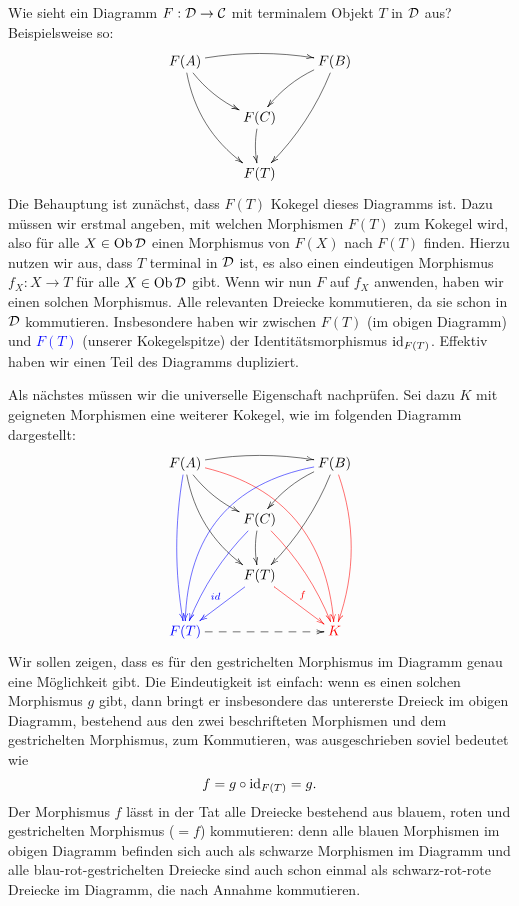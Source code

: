 \documentclass{pizzablatt}
\begin{document}

\begin{aufgabe}{}
Wie sieht ein Diagramm $F:\mathcal{D} \to \mathcal{C}$ mit terminalem Objekt $T$ in $\mathcal{D}$ aus? Beispielsweise so:
\[ \xymatrix{
  F(A) \ar@/^/[rr] \ar@/_/[dr] \ar@/_1pc/[ddr] && F(B) \ar@/_/[dl] \ar@/^/[ddl] \\
  & F(C) \ar@/_0.25pc/[d] \\
  & F(T)
} \]
Die Behauptung ist zunächst, dass $F(T)$ Kokegel dieses Diagramms ist. Dazu müssen wir erstmal angeben, mit welchen Morphismen $F(T)$ zum Kokegel wird, also für alle $X \in \operatorname{Ob} \mathcal{D}$ einen Morphismus von $F(X)$ nach $F(T)$ finden. Hierzu nutzen wir aus, dass $T$ terminal in $\mathcal{D}$ ist, es also einen eindeutigen Morphismus $f_X:X \to T$ für alle $X \in \operatorname{Ob} \mathcal{D}$ gibt. Wenn wir nun $F$ auf $f_X$ anwenden, haben wir einen solchen Morphismus. Alle relevanten Dreiecke kommutieren, da sie schon in $\mathcal{D}$ kommutieren. Insbesondere haben wir zwischen $F(T)$ (im obigen Diagramm) und \textcolor{blue}{$F(T)$} (unserer Kokegelspitze) der Identitätsmorphismus \textcolor{blue}{$\mathrm{id}_{F(T)}$}. Effektiv haben wir einen Teil des Diagramms dupliziert.

Als nächstes müssen wir die universelle Eigenschaft nachprüfen. Sei dazu $K$ mit geigneten Morphismen eine weiterer Kokegel, wie im folgenden Diagramm dargestellt:
\[ \xymatrix{
  F(A) \ar@/^/[rr] \ar@/_/[dr] \ar@/_1pc/[ddr] \ar@/_0.5pc/@[blue][ddd] \ar@/^2.7pc/@[red][dddrr] && F(B) \ar@/_/[dl] \ar@/^/[ddl] \ar@/_3pc/@[blue][llddd] \ar@/^1pc/@[red][ddd] \\
  & F(C) \ar@/_0.25pc/[d] \ar@/_0.5pc/@[blue][ldd] \ar@/^0.5pc/@[red][rdd] \\
  & F(T) \ar@[blue][ld]_{\color{blue}{id}} \ar@[red][rd]^{\color{red}{f}} \\
  \color{blue}{F(T)} \ar@{-->}[rr] && \color{red}{K}
} \]
Wir sollen zeigen, dass es für den gestrichelten Morphismus im Diagramm genau eine Möglichkeit gibt. Die Eindeutigkeit ist einfach: wenn es einen solchen Morphismus $g$ gibt, dann bringt er insbesondere das untererste Dreieck im obigen Diagramm, bestehend aus den zwei beschrifteten Morphismen und dem gestrichelten Morphismus, zum Kommutieren, was ausgeschrieben soviel bedeutet wie
\[ f = g \circ \mathrm{id}_{F(T)} = g. \]
Der Morphismus $f$ lässt in der Tat alle Dreiecke bestehend aus blauem, roten und gestrichelten Morphismus ($= f$) kommutieren: denn alle blauen Morphismen im obigen Diagramm befinden sich auch als schwarze Morphismen im Diagramm und alle blau-rot-gestrichelten Dreiecke sind auch schon einmal als schwarz-rot-rote Dreiecke im Diagramm, die nach Annahme kommutieren.
\end{aufgabe}
\end{document}
